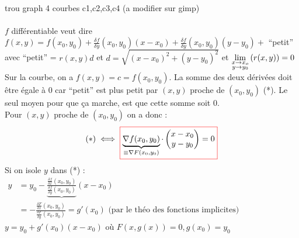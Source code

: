 \documentclass[12pt,a4paper]{article}
\begin{document}
\\
{trou graph 4 courbes c1,c2,c3,c4 (a modifier sur gimp)}\\
\\
$f$ différentiable veut dire $f(x,y) = f(x_0,y_0) + \frac{\delta f}{\delta y}(x_0,y_0)(x-x_0) + \frac{\delta f}{\delta y}(x_0,y_0)(y-y_0) +$ \enquote{petit}\\
avec \enquote{petit} = $r(x,y) d$ et $d = \sqrt{(x-x_0)^2 + (y-y_0)^2}$ et $\lim\limits_{\substack{x\to x_o \\ y\to y_0}}\left(r(x,y)\right) = 0$\\
Sur la courbe, on a $f(x,y) = c = f(x_0,y_0)$. La somme des deux dérivées doit être égale à 0 car \enquote{petit} est plus petit par $(x,y)$ proche de $(x_0,y_0)$ (*). Le seul moyen pour que ça marche, est que cette somme soit 0.\\
Pour $(x,y)$ proche de $(x_0,y_0)$ on a donc :
\begin{equation*}
	(*) \iff \text{\fcolorbox{red}{white}{$\underbrace{\nabla f(x_0,y_0)}_{\equiv \nabla F(x_0,y_0)} \cdot\combi{x-x_0}{y-y_0} = 0$}}
\end{equation*}
Si on isole $y$ dans (*) : 
$\begin{array}{ll}
y &= y_0 - \underbrace{\frac{\frac{\delta f}{\delta x} (x_0,y_0)}{\frac{\delta f}{\delta y}(x_0,y_0)}} (x-x_0)\\
&  = -\frac{\frac{\delta F}{\delta x} (x_0,y_0)}{\frac{\delta F}{\delta y}(x_0,y_0)} = g'(x_0) \text{ (par le théo des fonctions implicites)}
\end{array}$\\
$y = y_0 + g'(x_0)(x-x_0)$ où $F(x,g(x)) = 0, g(x_0) = y_0$
\end{document}
